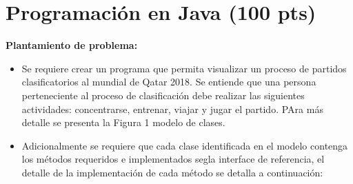 \documentclass{exam}
\begin{document}
\vspace{-7mm}
\newpage
\section{\textbf{Programaci\'on en Java (100 pts)}}
\noindent
\textbf{Plantamiento de problema: }

\begin{questions}

  \begin{itemize}
    \item  Se requiere crear un programa que permita visualizar un proceso de partidos clasificatorios al mundial de Qatar 2018.  Se entiende que una persona perteneciente al proceso de clasificación debe
    realizar las siguientes actividades: concentrarse, entrenar, viajar y jugar el partido. PAra más detalle se presenta la Figura 1 modelo de clases.
\item Adicionalmente se requiere que cada clase identificada en el modelo contenga los m\'etodos requeridos e implementados seg\un la interface de referencia, el detalle de la implementaci\'on de
cada m\'etodo se detalla a continuaci\'on:


\end{itemize}
\end{questions}
\end{document}
